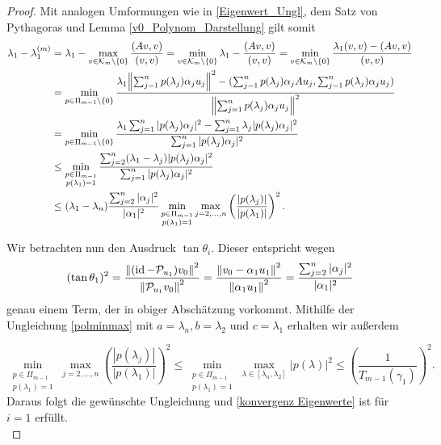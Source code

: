 \documentclass{article}
\begin{document}
\begin{theorem}
\begin{proof}
	Mit analogen Umformungen wie in \eqref{Eigenwert_Ungl}, dem Satz von Pythagoras und Lemma \ref{v0_Polynom_Darstellung} gilt somit
	\begin{equation}
		\label{Ungl i=1}
		\begin{aligned}
			\lambda_1 - \lambda_1^{(m)} &= \lambda_1 - \max_{v \in \mathcal{K}_m \setminus\{0\}} \frac{(Av,v)}{(v,v)} = \min_{v \in \mathcal{K}_m\setminus\{0\}} \lambda_1 - \frac{(Av,v)}{(v,v)} = \min_{v \in \mathcal{K}_m\setminus\{0\}} \frac{\lambda_1(v,v) - (Av,v)}{(v,v)} \\ &= \min_{p\in \Pi_{m-1}\setminus \{0\}} \frac{\lambda_1 {\left \| \sum_{j=1}^{n}p(\lambda_j)\alpha_j u_j \right \|}_{}^2 - (\sum_{j=1}^{n}p(\lambda_j)\alpha_j A u_j,\sum_{j=1}^{n}p(\lambda_j)\alpha_j u_j)}{{\left \| \sum_{j=1}^{n}p(\lambda_j)\alpha_j u_j \right \|}_{}^2} \\
			&= \min_{p\in \Pi_{m-1}\setminus \{0\}} \frac{\lambda_1 \sum_{j=1}^{n} |p(\lambda_j)\alpha_j|^2 - \sum_{j=1}^{n} \lambda_j |p(\lambda_j)\alpha_j|^2 }{\sum_{j=1}^{n} |p(\lambda_j)\alpha_j|^2} \\
			&\le \min_{\substack{p\in \Pi_{m-1} \\ p(\lambda_1) =1}} \frac{\sum_{j=2}^{n} (\lambda_1 - \lambda_j)|p(\lambda_j)\alpha_j|^2}{\sum_{j=1}^{n} |p(\lambda_j)\alpha_j|^2} \\
			&\le (\lambda_1 - \lambda_n) \frac{\sum_{j=2}^{n} |\alpha_j|^2}{|\alpha_1|^2} \min_{\substack{p\in \Pi_{m-1} \\ p(\lambda_1) =1}} \max_{j=2,\dots,n} \left(\frac{|p(\lambda_j)|}{|p(\lambda_1)|}\right)^2.
		\end{aligned}
	\end{equation}

	Wir betrachten nun den Ausdruck $\tan \theta_i$. Dieser entspricht wegen
		\begin{equation*}
			(\tan\theta_1)^2 = \frac{{\left \| (\operatorname{id} - \mathcal{P}_{u_1})v_0 \right \|}_{}^2}{{\left \|  \mathcal{P}_{u_1}v_0 \right \|}_{}^2} = \frac{{\left \| v_0 - \alpha_1 u_1 \right \|}_{}^2}{{\left \| \alpha_1 u_1 \right \|}_{}^2} = \frac{\sum_{j=2}^{n} |\alpha_j|^2}{|\alpha_1|^2}
		\end{equation*}
	genau einem Term, der in obiger Abschätzung vorkommt.
	Mithilfe der Ungleichung \eqref{polminmax} mit $a = \lambda_n, b= \lambda_2$ und $c= \lambda_1$ erhalten wir außerdem

		\begin{equation*}
			\min_{\substack{p\in \Pi_{m-1} \\ p(\lambda_1) = 1}} \max_{j=2,\dots,n} 	\left(\frac{|p(\lambda_j)|}{|p(\lambda_1)|}\right)^2 \le \min_{\substack{p\in \Pi_{m-1} \\ p(\lambda_1) = 1}} \max_{\lambda \in [\lambda_n,\lambda_2]} |p(\lambda)|^2 \le \left(\frac{1}{T_{m-1}(\gamma_1)}\right)^2.
		\end{equation*}
	Daraus folgt die gewünschte Ungleichung und \eqref{konvergenz Eigenwerte} ist für $i = 1$ erfüllt.\\


\end{proof}
\end{theorem}
\end{document}
